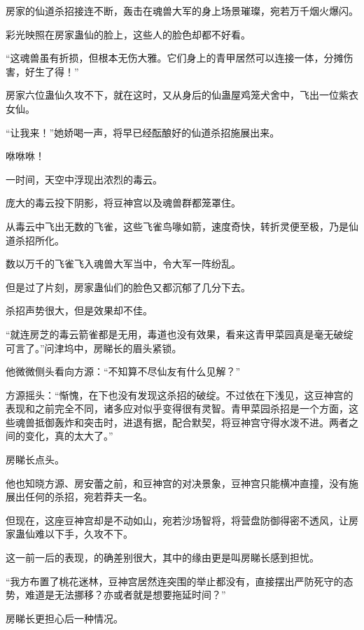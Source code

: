 
\begin{this_body}

房家的仙道杀招接连不断，轰击在魂兽大军的身上场景璀璨，宛若万千烟火爆闪。

彩光映照在房家蛊仙的脸上，这些人的脸色却都不好看。

“这魂兽虽有折损，但根本无伤大雅。它们身上的青甲居然可以连接一体，分摊伤害，好生了得！”

房家六位蛊仙久攻不下，就在这时，又从身后的仙蛊屋鸡笼犬舍中，飞出一位紫衣女仙。

“让我来！”她娇喝一声，将早已经酝酿好的仙道杀招施展出来。

咻咻咻！

一时间，天空中浮现出浓烈的毒云。

庞大的毒云投下阴影，将豆神宫以及魂兽群都笼罩住。

从毒云中飞出无数的飞雀，这些飞雀鸟喙如箭，速度奇快，转折灵便至极，乃是仙道杀招所化。

数以万千的飞雀飞入魂兽大军当中，令大军一阵纷乱。

但是过了片刻，房家蛊仙们的脸色又都沉郁了几分下去。

杀招声势很大，但是效果却不佳。

“就连房芝的毒云箭雀都是无用，毒道也没有效果，看来这青甲菜园真是毫无破绽可言了。”问津坞中，房睇长的眉头紧锁。

他微微侧头看向方源：“不知算不尽仙友有什么见解？”

方源摇头：“惭愧，在下也没有发现这杀招的破绽。不过依在下浅见，这豆神宫的表现和之前完全不同，诸多应对似乎变得很有灵智。青甲菜园杀招是一个方面，这些魂兽抵御轰炸和突击时，进退有据，配合默契，将豆神宫守得水泼不进。两者之间的变化，真的太大了。”

房睇长点头。

他也知晓方源、房安蕾之前，和豆神宫的对决景象，豆神宫只能横冲直撞，没有施展出任何的杀招，宛若莽夫一名。

但现在，这座豆神宫却是不动如山，宛若沙场智将，将营盘防御得密不透风，让房家蛊仙难以下手，久攻不下。

这一前一后的表现，的确差别很大，其中的缘由更是叫房睇长感到担忧。

“我方布置了桃花迷林，豆神宫居然连突围的举止都没有，直接摆出严防死守的态势，难道是无法挪移？亦或者就是想要拖延时间？”

房睇长更担心后一种情况。


\end{this_body}

